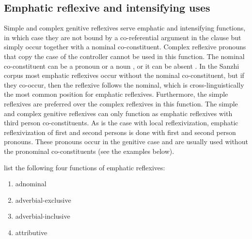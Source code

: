 
\subsection{Emphatic reflexive and intensifying uses}
\label{ssec:Emphatic reflexive use}

Simple and complex genitive reflexives serve emphatic and intensifying functions, in which case they are not bound by a co-referential argument in the clause but simply occur together with a nominal co-constituent. Complex reflexive pronouns that copy the case of the controller cannot be used in this function. The nominal co-constituent can be a pronoun  or a noun , or it can be absent . In the Sanzhi corpus most emphatic reflexives occur without the nominal co-constituent, but if they co-occur, then the reflexive follows the nominal, which is cross-linguistically the most common position for emphatic reflexives. Furthermore, the simple reflexives are preferred over the complex reflexives in this function. The simple and complex genitive reflexives can only function as emphatic reflexives with third person co-constituents. As is the case with local reflexivization, emphatic reflexivization of first and second persons is done with first and second person pronouns. These pronouns occur in the genitive case and are usually used without the pronominal co-constituents (see the examples below).

\citet{König.Gast2006} list the following four functions of emphatic reflexives:
%
\begin{enumerate}
	\item	adnominal 
	\item	adverbial-exclusive  
	\item	adverbial-inclusive  
	\item	attributive 
\end{enumerate}

